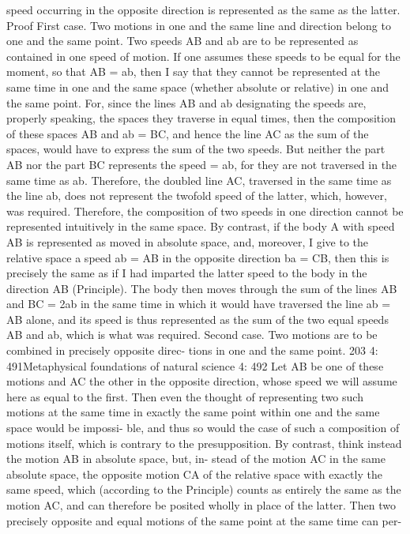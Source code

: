 speed occurring in the opposite direction is represented as the same as
the latter.
Proof
First case. Two motions in one and the same line and direction belong to one
and the same point.
Two speeds AB and ab are to be represented as contained in one speed
of motion. If one assumes these speeds to be equal for the moment, so
that AB = ab, then I say that they cannot be represented at the same
time in one and the same space (whether absolute or relative) in one and
the same point. For, since the lines AB and ab designating the speeds
are, properly speaking, the spaces they traverse in equal times, then the
composition of these spaces AB and ab = BC, and hence the line AC as
the sum of the spaces, would have to express the sum of the two speeds.
But neither the part AB nor the part BC represents the speed = ab, for
they are not traversed in the same time as ab. Therefore, the doubled
line AC, traversed in the same time as the line ab, does not represent the
twofold speed of the latter, which, however, was required. Therefore,
the composition of two speeds in one direction cannot be represented
intuitively in the same space.
By contrast, if the body A with speed AB is represented as moved in
absolute space, and, moreover, I give to the relative space a speed ab =
AB in the opposite direction ba = CB, then this is precisely the same
as if I had imparted the latter speed to the body in the direction AB
(Principle). The body then moves through the sum of the lines AB and
BC = 2ab in the same time in which it would have traversed the line
ab = AB alone, and its speed is thus represented as the sum of the two
equal speeds AB and ab, which is what was required.
Second case. Two motions are to be combined in precisely opposite direc-
tions in one and the same point.
203
4: 491Metaphysical foundations of natural science
4: 492
Let AB be one of these motions and AC the other in the opposite
direction, whose speed we will assume here as equal to the ﬁrst. Then
even the thought of representing two such motions at the same time in
exactly the same point within one and the same space would be impossi-
ble, and thus so would the case of such a composition of motions itself,
which is contrary to the presupposition.
By contrast, think instead the motion AB in absolute space, but, in-
stead of the motion AC in the same absolute space, the opposite motion
CA of the relative space with exactly the same speed, which (according
to the Principle) counts as entirely the same as the motion AC, and can
therefore be posited wholly in place of the latter. Then two precisely
opposite and equal motions of the same point at the same time can per-
